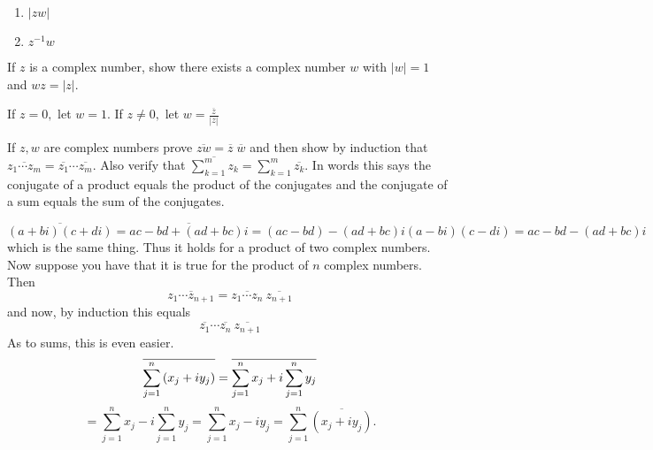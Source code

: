 \begin{enumialphparenastyle}
\begin{ex}
\begin{enumerate}
\item $\left| zw \right|$

\item $z^{-1}w$

\end{enumerate}
\end{ex}

\begin{ex} If $z$ is a complex number, show there exists a complex
number $w$ with $\left\vert w \right\vert =1$ and $wz=\left\vert
z\right\vert .$ 
\begin{sol}
If $z=0,$ let $w =1.$ If $z\neq 0,$ let $w =\displaystyle\frac{\overline{z}}{\left\vert z\right\vert }$
\end{sol}
\end{ex}

\begin{ex} \label{exercomplex2}If $z,w$ are complex
 numbers prove $
\overline{zw}=\overline{z} \; \overline{w}$ and then show by induction that 
$\overline{z_{1}\cdots z_{m}}=\overline{z_{1}}\cdots \overline{z_{m}}$. Also
verify that $\overline{\sum_{k=1}^{m}z_{k}}=\sum_{k=1}^{m}\overline{z_{k}}$.
In words this says the conjugate of a product equals the product of the
conjugates and the conjugate of a sum equals the sum of the conjugates. 
\begin{sol}
\[
\overline{\left( a+bi\right) \left( c+di\right) }=\overline{ac-bd+\left(
ad+bc\right)i }=\left( ac-bd\right) -\left( ad+bc\right)i \left(
a-bi\right) \left( c-di\right) =ac-bd-\left( ad+bc\right)i 
\]
 which is the
same thing. Thus it holds for a product of two complex numbers. Now suppose
 you have that it is true for the product of $n$ complex numbers. Then
\[
\overline{z_{1}\cdots z_{n+1}}=\overline{z_{1}\cdots z_{n}}\ \overline{
z_{n+1}}
\]
and now, by induction this equals
\[
\overline{z_{1}}\cdots \overline{z_{n}}\ \overline{z_{n+1}}
\]
As to sums, this is even easier.
\[
\overline{\sum_{j=1}^{n}\left( x_{j}+iy_{j}\right) }=\overline{%
\sum_{j=1}^{n}x_{j}+i\sum_{j=1}^{n}y_{j}}
\]
\[
=\sum_{j=1}^{n}x_{j}-i\sum_{j=1}^{n}y_{j}=\sum_{j=1}^{n}x_{j}-iy_{j}=
\sum_{j=1}^{n}\overline{\left( x_{j}+iy_{j}\right) }.
\]
\end{sol}
\end{ex}


\end{enumialphparenastyle}
